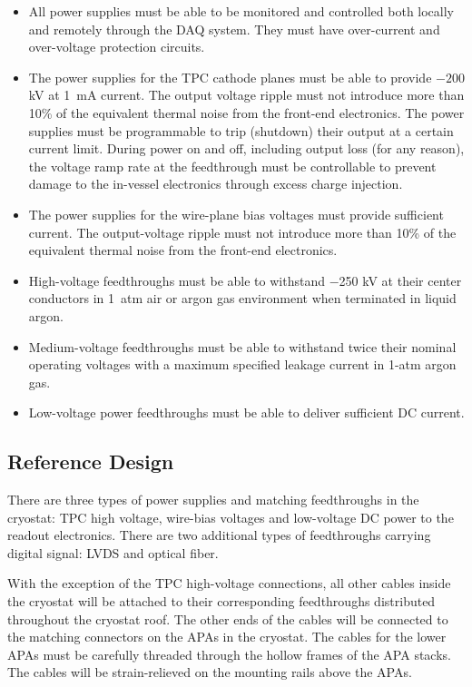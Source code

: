 \begin{itemize}
\item All power supplies must be able to be monitored and 
controlled both locally and remotely through the DAQ system.  
They must have over-current and over-voltage protection circuits.
\item The power supplies for the TPC cathode planes 
must be able to provide $-200$ kV at 1~mA current. The output voltage ripple 
must not introduce more than 10\% of the equivalent thermal noise from the front-end electronics. 
The power supplies must be programmable to trip (shutdown) 
their output at a certain current limit.  During power on and off, 
including output loss (for any reason), the voltage ramp rate at the 
feedthrough must be controllable to prevent 
damage to the in-vessel electronics through excess charge injection.
\item The power supplies for the wire-plane bias voltages
must provide sufficient current.   The output-voltage ripple 
must not introduce more than 10\% of the equivalent thermal noise from the front-end electronics. 
\item High-voltage feedthroughs must be able to withstand $-$250 kV 
at their center conductors in 1~atm air or argon gas environment when terminated in liquid argon.
\item Medium-voltage feedthroughs must be able to withstand twice their nominal operating voltages 
with a maximum specified leakage current in 1-atm argon gas.
\item Low-voltage power feedthroughs must be able to deliver 
sufficient DC current.
\end{itemize}

\subsection{Reference Design} 
\label{subsec:v5-tpc-feedthru-desc}

There are three types of power supplies and matching 
feedthroughs in the cryostat: TPC high voltage, 
wire-bias voltages and low-voltage DC power to the readout electronics. There are two additional 
types of feedthroughs carrying digital signal: LVDS and optical fiber.

With the exception of the TPC high-voltage connections, all other 
cables inside the cryostat will be attached to their corresponding feedthroughs distributed throughout the cryostat roof.  The other ends of the cables will be connected to the matching connectors on the APAs in the cryostat.  The cables for the lower APAs must be carefully threaded through the hollow frames of the APA stacks.  The cables will be strain-relieved on the  mounting rails above the APAs. 

